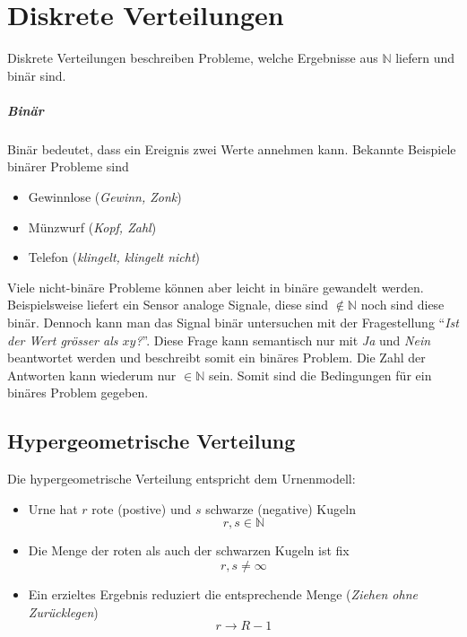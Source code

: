 



\chapter{Diskrete Verteilungen}
Diskrete Verteilungen beschreiben Probleme, welche
Ergebnisse aus $\mathbb{N}$ liefern und binär sind.

\paragraph{Binär}
Binär bedeutet, dass ein Ereignis zwei Werte annehmen kann. Bekannte
Beispiele binärer Probleme sind
\begin{itemize}
	\item Gewinnlose \hfill{} (\emph{Gewinn, Zonk})
	\item Münzwurf \hfill{} (\emph{Kopf, Zahl})
	\item Telefon \hfill{} (\emph{klingelt, klingelt nicht})
\end{itemize}
Viele nicht-binäre Probleme können aber leicht in binäre gewandelt
werden. Beispielsweise liefert ein Sensor analoge Signale, diese sind
$\notin \mathbb{N}$ noch sind diese binär. 
Dennoch kann man das Signal binär
untersuchen mit der Fragestellung 
"`\emph{Ist der Wert grösser als $xy$?}"'.
Diese Frage kann semantisch nur mit \emph{Ja} und \emph{Nein} beantwortet
werden und beschreibt somit ein binäres Problem. Die Zahl der Antworten
kann wiederum nur $\in \mathbb{N}$ sein. Somit sind die Bedingungen 
für ein binäres Problem gegeben.

\newpage
\section{Hypergeometrische Verteilung}
Die hypergeometrische Verteilung entspricht dem Urnenmodell:
\begin{itemize}
	\item Urne hat $r$ rote (postive) und $s$ schwarze (negative)
		Kugeln
		\[ r,s \in \mathbb{N} \]
	\item Die Menge der roten als auch der schwarzen Kugeln ist fix 
		\[ r,s \neq \infty \]
	\item Ein erzieltes Ergebnis reduziert die entsprechende Menge
		(\emph{Ziehen ohne Zurücklegen})
		\[ r \rightarrow  R - 1\]
\end{itemize}

